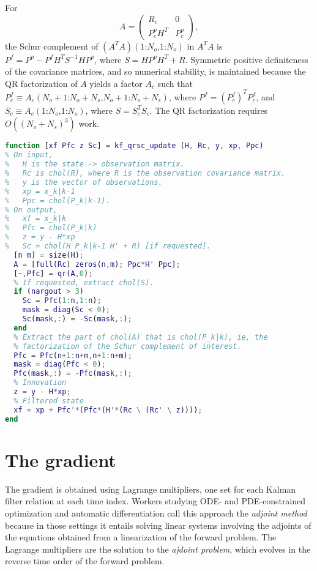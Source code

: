 \documentclass[10pt,fleqn]{article}
\newcommand{\matcol}{\ensuremath{\text{:}}}
\newcommand{\matcom}{\ensuremath{\text{,}}}
\newcommand{\pmat}[1]{\ensuremath{\begin{pmatrix} #1 \end{pmatrix}}}
\begin{document}
For
\begin{equation*}
  A = \pmat{R_c & 0 \\ P^p_c H^T & P^p_c},
\end{equation*}
the Schur complement of $(A^T A)(1 \matcol N_o \matcom 1 \matcol N_o)$ in $A^T
A$ is $P^f = P^p - P^f H^T S^{-1} H P^p$, where $S = H P^p H^T + R$. Symmetric
positive definiteness of the covariance matrices, and so numerical stability, is
maintained because the QR factorization of $A$ yields a factor $A_c$ such that
$P^f_c \equiv A_c(N_o+1 \matcol N_o + N_s \matcom N_o+1 \matcol N_o + N_s)$,
where $P^f = (P^f_c)^T P^f_c$, and $S_c \equiv A_c(1 \matcol N_o \matcom 1
\matcol N_o)$, where $S = S_c^T S_c$. The QR factorization requires $O((N_o +
N_s)^3)$ work.
\begin{lstlisting}[language=matlab,basicstyle=\footnotesize]
function [xf Pfc z Sc] = kf_qrsc_update (H, Rc, y, xp, Ppc)
% On input,
%   H is the state -> observation matrix.
%   Rc is chol(R), where R is the observation covariance matrix.
%   y is the vector of observations.
%   xp = x_k|k-1
%   Ppc = chol(P_k|k-1).
% On output,
%   xf = x_k|k
%   Pfc = chol(P_k|k)
%   z = y - H*xp
%   Sc = chol(H P_k|k-1 H' + R) [if requested].
  [n m] = size(H);
  A = [full(Rc) zeros(n,m); Ppc*H' Ppc];
  [~,Pfc] = qr(A,0);
  % If requested, extract chol(S).
  if (nargout > 3)
    Sc = Pfc(1:n,1:n);
    mask = diag(Sc < 0);
    Sc(mask,:) = -Sc(mask,:);
  end
  % Extract the part of chol(A) that is chol(P_k|k), ie, the
  % factorization of the Schur complement of interest.
  Pfc = Pfc(n+1:n+m,n+1:n+m);
  mask = diag(Pfc < 0);
  Pfc(mask,:) = -Pfc(mask,:);
  % Innovation
  z = y - H*xp;
  % Filtered state
  xf = xp + Pfc'*(Pfc*(H'*(Rc \ (Rc' \ z))));
end
\end{lstlisting}

\section{The gradient}
The gradient is obtained using Lagrange multipliers, one set for each Kalman
filter relation at each time index. Workers studying ODE- and PDE-constrained
optimization and automatic differentiation call this approach the \emph{adjoint
  method} because in those settings it entails solving linear systems involving
the adjoints of the equations obtained from a linearization of the forward
problem. The Lagrange multipliers are the solution to the \emph{ajdoint
  problem}, which evolves in the reverse time order of the forward problem.
\end{document}
